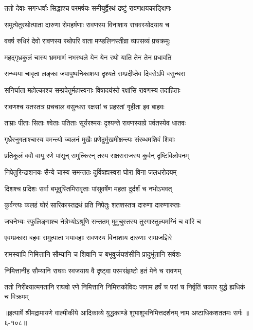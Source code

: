 \twolineshloka
{ततो देवाः सगन्धर्वाः सिद्धाश्च परमर्षयः}
{समीयुर्द्वैरथं द्रष्टुं रावणक्षयकाङ्क्षिणः} %

\twolineshloka
{समुत्पेतुरथोत्पाता दारुणा रोमहर्षणाः}
{रावणस्य विनाशाय राघवस्योदयाय च} %

\twolineshloka
{ववर्ष रुधिरं देवो रावणस्य रथोपरि}
{वाता मण्डलिनस्तीव्रा व्यपसव्यं प्रचक्रमुः} %

\twolineshloka
{महद्गृध्रकुलं चास्य भ्रममाणं नभस्थले}
{येन येन रथो याति तेन तेन प्रधावति} %

\twolineshloka
{सन्ध्यया चावृता लङ्का जपापुष्पनिकाशया}
{दृश्यते सम्प्रदीप्तेव दिवसेऽपि वसुन्धरा} %

\twolineshloka
{सनिर्घाता महोल्काश्च सम्प्रपेतुर्महास्वनाः}
{विषादयंस्ते रक्षांसि रावणस्य तदाहिताः} %

\twolineshloka
{रावणश्च यतस्तत्र प्रचचाल वसुन्धरा}
{रक्षसां च प्रहरतां गृहीता इव बाहवः} %

\twolineshloka
{ताम्राः पीताः सिताः श्वेताः पतिताः सूर्यरश्मयः}
{दृश्यन्ते रावणस्याग्रे पर्वतस्येव धातवः} %

\twolineshloka
{गृध्रैरनुगताश्चास्य वमन्त्यो ज्वलनं मुखैः}
{प्रणेदुर्मुखमीक्षन्त्यः संरब्धमशिवं शिवाः} %

\twolineshloka
{प्रतिकूलं ववौ वायू रणे पांसून् समुत्किरन्}
{तस्य राक्षसराजस्य कुर्वन् दृष्टिविलोपनम्} %

\twolineshloka
{निपेतुरिन्द्राशनयः सैन्ये चास्य समन्ततः}
{दुर्विषह्यस्वरा घोरा विना जलधरोदयम्} %

\twolineshloka
{दिशश्च प्रदिशः सर्वा बभूवुस्तिमिरावृताः}
{पांसुवर्षेण महता दुर्दर्शं च नभोऽभवत्} %

\twolineshloka
{कुर्वन्त्यः कलहं घोरं सारिकास्तद्रथं प्रति}
{निपेतुः शतशस्तत्र दारुणा दारुणारुताः} %

\twolineshloka
{जघनेभ्यः स्फुलिङ्गाश्च नेत्रेभ्योऽश्रूणि सन्ततम्}
{मुमुचुस्तस्य तुरगास्तुल्यमग्निं च वारि च} %

\twolineshloka
{एवम्प्रकारा बहवः समुत्पाता भयावहाः}
{रावणस्य विनाशाय दारुणाः सम्प्रजज्ञिरे} %

\twolineshloka
{रामस्यापि निमित्तानि सौम्यानि च शिवानि च}
{बभूवुर्जयशंसीनि प्रादुर्भूतानि सर्वशः} %

\twolineshloka
{निमित्तानीह सौम्यानि राघवः स्वजयाय वै}
{दृष्ट्वा परमसंहृष्टो हतं मेने च रावणम्} %

\twolineshloka
{ततो निरीक्ष्यात्मगतानि राघवो रणे निमित्तानि निमित्तकोविदः}
{जगाम हर्षं च परां च निर्वृतिं चकार युद्धे ह्यधिकं च विक्रमम्} %


॥इत्यार्षे श्रीमद्रामायणे वाल्मीकीये आदिकाव्ये युद्धकाण्डे शुभाशुभनिमित्तदर्शनम् नाम अष्टाधिकशततमः सर्गः ॥६-१०८॥
